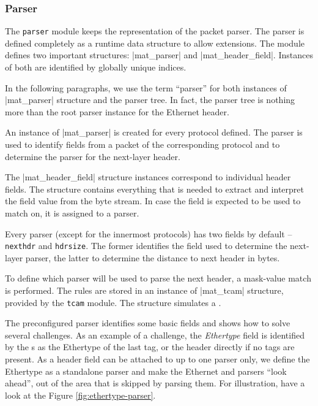 \subsubsection{Parser}

The \texttt{parser} module keeps the representation of the packet parser. The
parser is defined completely as a runtime data structure to allow extensions.
The module defines two important structures: \struct|mat_parser| and
\struct|mat_header_field|. Instances of both are identified by globally unique indices.

In the following paragraphs, we use the term ``parser'' for both instances of
\struct|mat_parser| structure and the parser tree. In fact, the parser tree is
nothing more than the root parser instance for the Ethernet header.

An instance of \struct|mat_parser| is created for every protocol defined. The
parser is used to identify fields from a packet of the corresponding protocol
and to determine the parser for the next-layer header.

The \struct|mat_header_field| structure instances correspond to individual
header fields. The structure contains everything that is needed to extract and
interpret the field value from the byte stream. In case the field is expected
to be used to match on, it is assigned to a parser.

Every parser (except for the innermost protocols) has two fields by default
-- \Verb|nexthdr| and \Verb|hdrsize|. The former identifies the field used
to determine the next-layer parser, the latter to determine the distance to
next header in bytes.

To define which parser will be used to parse the next header, a mask-value
match is performed. The rules are stored in an instance of \struct|mat_tcam| structure,
provided by the \texttt{tcam} module. The structure simulates a .

The preconfigured parser identifies some basic fields and shows how to solve
several challenges. As an example of a challenge, the \emph{Ethertype} field is
identified by the s as the Ethertype of the last  tag, or the
 header directly if no  tags are present. As a header field can
be attached to up to one parser only, we define the Ethertype as a standalone
parser and make the Ethernet and  parsers ``look ahead'', out of the
area that is skipped by parsing them. For illustration, have a look at the
Figure \ref{fig:ethertype-parser}.

